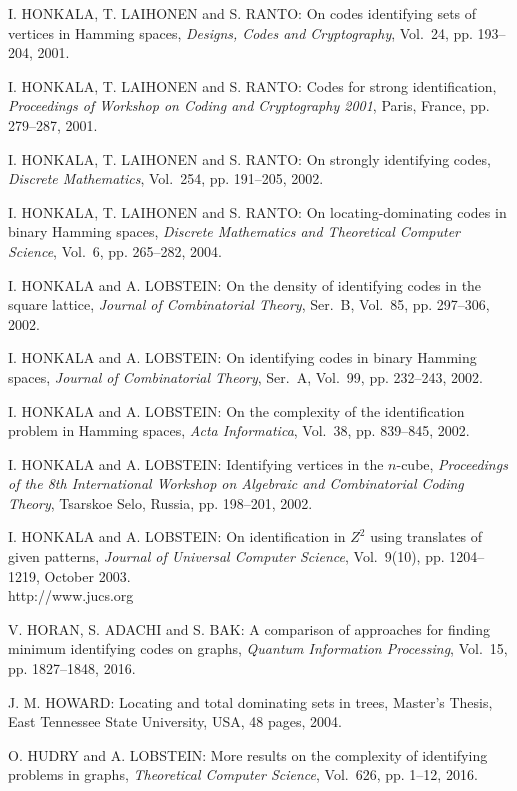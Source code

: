 \begin{thebibliography}{999}
I. HONKALA, T. LAIHONEN and S. RANTO: On codes identifying sets of vertices in Hamming spaces, {\it Designs, Codes and Cryptography}, Vol.~24, pp. 193--204, 2001.

I. HONKALA, T. LAIHONEN and S. RANTO: Codes for strong identification, {\it Proceedings of Workshop on Coding and Cryptography 2001}, Paris, France, pp. 279--287, 2001.

I. HONKALA, T. LAIHONEN and S. RANTO: On strongly identifying codes, {\it Discrete Mathematics}, Vol.~254, pp. 191--205, 2002.

I. HONKALA, T. LAIHONEN and S. RANTO: On locating-dominating codes in binary Hamming spaces, {\it Discrete Mathematics and Theoretical Computer Science}, Vol.~6, pp. 265--282, 2004.

I. HONKALA and A. LOBSTEIN: On the density of identifying codes in the square lattice, {\it Journal of Combinatorial Theory}, Ser.~B, Vol.~85, pp. 297--306, 2002.

I. HONKALA and A. LOBSTEIN: On identifying codes in binary Hamming spaces, {\it Journal of Combinatorial Theory}, Ser.~A, Vol.~99, pp. 232--243, 2002.

I. HONKALA and A. LOBSTEIN: On the complexity of the identification problem in Hamming spaces, {\it Acta Informatica}, Vol.~38, pp. 839--845, 2002.

I. HONKALA and A. LOBSTEIN: Identifying vertices in the $n$-cube, {\it Proceedings of the 8th International Workshop on Algebraic and Combinatorial Coding Theory}, Tsarskoe Selo, Russia, pp. 198--201, 2002.

I. HONKALA and A. LOBSTEIN: On identification in $Z^2$ using translates of given patterns, {\it Journal of Universal Computer Science}, Vol.~9(10), pp. 1204--1219, October 2003.\\
http://www.jucs.org

V. HORAN, S. ADACHI and S. BAK: A comparison of approaches for finding minimum identifying codes on graphs, {\it Quantum Information Processing}, Vol.~15, pp. 1827--1848, 2016.

J. M. HOWARD: Locating and total dominating sets in trees, Master's Thesis, East Tennessee State University, USA, 48 pages, 2004.

O. HUDRY and A. LOBSTEIN: More results on the complexity of identifying problems in graphs, {\it Theoretical Computer Science}, Vol.~626, pp. 1--12, 2016.


\end{thebibliography}
